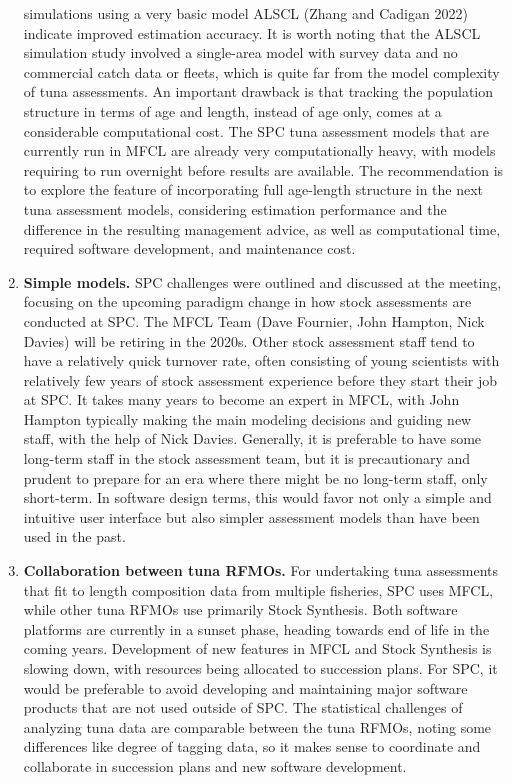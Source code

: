 \documentclass{SCreport}
\begin{document}
\begin{enumerate}
  simulations using a very basic model ALSCL (Zhang and Cadigan 2022) indicate
  improved estimation accuracy. It is worth noting that the ALSCL simulation
  study involved a single-area model with survey data and no commercial catch
  data or fleets, which is quite far from the model complexity of tuna
  assessments. An important drawback is that tracking the population structure
  in terms of age and length, instead of age only, comes at a considerable
  computational cost. The SPC tuna assessment models that are currently run in
  MFCL are already very computationally heavy, with models requiring to run
  overnight before results are available. The recommendation is to explore the
  feature of incorporating full age-length structure in the next tuna assessment
  models, considering estimation performance and the difference in the resulting
  management advice, as well as computational time, required software
  development, and maintenance cost.
  \item \textbf{Simple models.} SPC challenges were outlined and discussed at
  the meeting, focusing on the upcoming paradigm change in how stock assessments
  are conducted at SPC. The MFCL Team (Dave Fournier, John Hampton, Nick Davies)
  will be retiring in the 2020s. Other stock assessment staff tend to have a
  relatively quick turnover rate, often consisting of young scientists with
  relatively few years of stock assessment experience before they start their
  job at SPC. It takes many years to become an expert in MFCL, with John Hampton
  typically making the main modeling decisions and guiding new staff, with the
  help of Nick Davies. Generally, it is preferable to have some long-term staff
  in the stock assessment team, but it is precautionary and prudent to prepare
  for an era where there might be no long-term staff, only short-term. In
  software design terms, this would favor not only a simple and intuitive user
  interface but also simpler assessment models than have been used in the past.
  \item \textbf{Collaboration between tuna
    RFMOs.}\label{item:collaboration-rfmos} For undertaking tuna assessments
  that fit to length composition data from multiple fisheries, SPC uses MFCL,
  while other tuna RFMOs use primarily Stock Synthesis. Both software platforms
  are currently in a sunset phase, heading towards end of life in the coming
  years. Development of new features in MFCL and Stock Synthesis is slowing
  down, with resources being allocated to succession plans. For SPC, it would be
  preferable to avoid developing and maintaining major software products that
  are not used outside of SPC. The statistical challenges of analyzing tuna data
  are comparable between the tuna RFMOs, noting some differences like degree of
  tagging data, so it makes sense to coordinate and collaborate in succession
  plans and new software development.
\end{enumerate}
\end{document}
